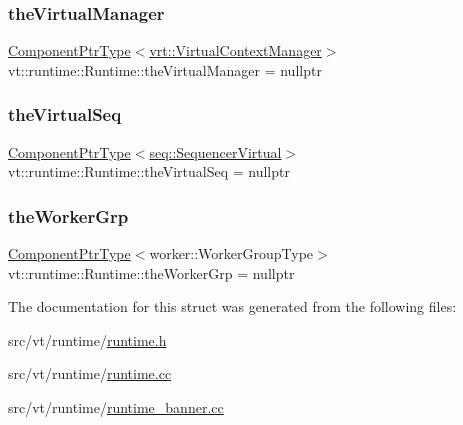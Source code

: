 \subsubsection{\texorpdfstring{the\+Virtual\+Manager}{theVirtualManager}}
{\footnotesize\ttfamily \hyperlink{structvt_1_1runtime_1_1_runtime_a0893bf0a8c03b898e8ab66b52cec80ad}{Component\+Ptr\+Type}$<$\hyperlink{structvt_1_1vrt_1_1_virtual_context_manager}{vrt\+::\+Virtual\+Context\+Manager}$>$ vt\+::runtime\+::\+Runtime\+::the\+Virtual\+Manager = nullptr}

\mbox{\label{structvt_1_1runtime_1_1_runtime_a74ae1d2bf02482293923592df10585c0}} 
\subsubsection{\texorpdfstring{the\+Virtual\+Seq}{theVirtualSeq}}
{\footnotesize\ttfamily \hyperlink{structvt_1_1runtime_1_1_runtime_a0893bf0a8c03b898e8ab66b52cec80ad}{Component\+Ptr\+Type}$<$\hyperlink{structvt_1_1seq_1_1_sequencer_virtual}{seq\+::\+Sequencer\+Virtual}$>$ vt\+::runtime\+::\+Runtime\+::the\+Virtual\+Seq = nullptr}

\mbox{\label{structvt_1_1runtime_1_1_runtime_a80634e73cafbe273448123746789fccb}} 
\subsubsection{\texorpdfstring{the\+Worker\+Grp}{theWorkerGrp}}
{\footnotesize\ttfamily \hyperlink{structvt_1_1runtime_1_1_runtime_a0893bf0a8c03b898e8ab66b52cec80ad}{Component\+Ptr\+Type}$<$worker\+::\+Worker\+Group\+Type$>$ vt\+::runtime\+::\+Runtime\+::the\+Worker\+Grp = nullptr}



The documentation for this struct was generated from the following files\+:\begin{DoxyCompactItemize}
\item 
src/vt/runtime/\hyperlink{runtime_8h}{runtime.\+h}\item 
src/vt/runtime/\hyperlink{runtime_8cc}{runtime.\+cc}\item 
src/vt/runtime/\hyperlink{runtime__banner_8cc}{runtime\+\_\+banner.\+cc}\end{DoxyCompactItemize}
